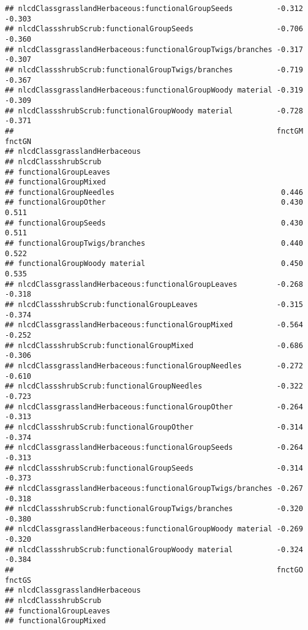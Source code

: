 \documentclass[]{article}
\begin{document}
\begin{verbatim}
## nlcdClassgrasslandHerbaceous:functionalGroupSeeds          -0.312 -0.303
## nlcdClassshrubScrub:functionalGroupSeeds                   -0.706 -0.360
## nlcdClassgrasslandHerbaceous:functionalGroupTwigs/branches -0.317 -0.307
## nlcdClassshrubScrub:functionalGroupTwigs/branches          -0.719 -0.367
## nlcdClassgrasslandHerbaceous:functionalGroupWoody material -0.319 -0.309
## nlcdClassshrubScrub:functionalGroupWoody material          -0.728 -0.371
##                                                            fnctGM fnctGN
## nlcdClassgrasslandHerbaceous                                            
## nlcdClassshrubScrub                                                     
## functionalGroupLeaves                                                   
## functionalGroupMixed                                                    
## functionalGroupNeedles                                      0.446       
## functionalGroupOther                                        0.430  0.511
## functionalGroupSeeds                                        0.430  0.511
## functionalGroupTwigs/branches                               0.440  0.522
## functionalGroupWoody material                               0.450  0.535
## nlcdClassgrasslandHerbaceous:functionalGroupLeaves         -0.268 -0.318
## nlcdClassshrubScrub:functionalGroupLeaves                  -0.315 -0.374
## nlcdClassgrasslandHerbaceous:functionalGroupMixed          -0.564 -0.252
## nlcdClassshrubScrub:functionalGroupMixed                   -0.686 -0.306
## nlcdClassgrasslandHerbaceous:functionalGroupNeedles        -0.272 -0.610
## nlcdClassshrubScrub:functionalGroupNeedles                 -0.322 -0.723
## nlcdClassgrasslandHerbaceous:functionalGroupOther          -0.264 -0.313
## nlcdClassshrubScrub:functionalGroupOther                   -0.314 -0.374
## nlcdClassgrasslandHerbaceous:functionalGroupSeeds          -0.264 -0.313
## nlcdClassshrubScrub:functionalGroupSeeds                   -0.314 -0.373
## nlcdClassgrasslandHerbaceous:functionalGroupTwigs/branches -0.267 -0.318
## nlcdClassshrubScrub:functionalGroupTwigs/branches          -0.320 -0.380
## nlcdClassgrasslandHerbaceous:functionalGroupWoody material -0.269 -0.320
## nlcdClassshrubScrub:functionalGroupWoody material          -0.324 -0.384
##                                                            fnctGO fnctGS
## nlcdClassgrasslandHerbaceous                                            
## nlcdClassshrubScrub                                                     
## functionalGroupLeaves                                                   
## functionalGroupMixed                                                    

\end{verbatim}
\end{document}
